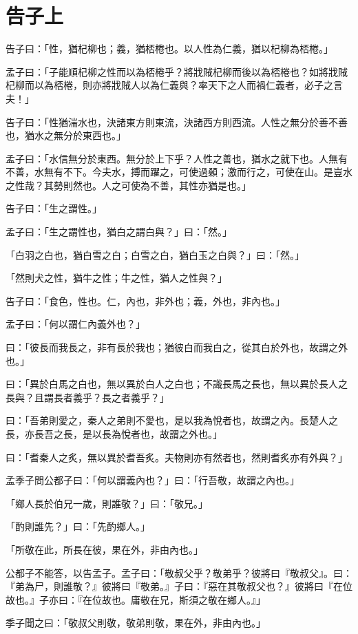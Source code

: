 \documentclass[12pt,a4paper]{ctexbook}
\begin{document}
\section{告子上}
告子曰：「性，猶杞柳也；義，猶桮棬也。以人性為仁義，猶以杞柳為桮棬。」\par
孟子曰：「子能順杞柳之性而以為桮棬乎？將戕賊杞柳而後以為桮棬也？如將戕賊杞柳而以為桮棬，則亦將戕賊人以為仁義與？率天下之人而禍仁義者，必子之言夫！」\par
告子曰：「性猶湍水也，決諸東方則東流，決諸西方則西流。人性之無分於善不善也，猶水之無分於東西也。」\par
孟子曰：「水信無分於東西。無分於上下乎？人性之善也，猶水之就下也。人無有不善，水無有不下。今夫水，搏而躍之，可使過顙；激而行之，可使在山。是豈水之性哉？其勢則然也。人之可使為不善，其性亦猶是也。」\par
告子曰：「生之謂性。」\par
孟子曰：「生之謂性也，猶白之謂白與？」曰：「然。」\par
「白羽之白也，猶白雪之白；白雪之白，猶白玉之白與？」曰：「然。」\par
「然則犬之性，猶牛之性；牛之性，猶人之性與？」\par
告子曰：「食色，性也。仁，內也，非外也；義，外也，非內也。」\par
孟子曰：「何以謂仁內義外也？」\par
曰：「彼長而我長之，非有長於我也；猶彼白而我白之，從其白於外也，故謂之外也。」\par
曰：「異於白馬之白也，無以異於白人之白也；不識長馬之長也，無以異於長人之長與？且謂長者義乎？長之者義乎？」\par
曰：「吾弟則愛之，秦人之弟則不愛也，是以我為悅者也，故謂之內。長楚人之長，亦長吾之長，是以長為悅者也，故謂之外也。」\par
曰：「耆秦人之炙，無以異於耆吾炙。夫物則亦有然者也，然則耆炙亦有外與？」\par
孟季子問公都子曰：「何以謂義內也？」曰：「行吾敬，故謂之內也。」\par
「鄉人長於伯兄一歲，則誰敬？」曰：「敬兄。」\par
「酌則誰先？」曰：「先酌鄉人。」\par
「所敬在此，所長在彼，果在外，非由內也。」\par
公都子不能答，以告孟子。孟子曰：「敬叔父乎？敬弟乎？彼將曰『敬叔父』。曰：『弟為尸，則誰敬？』彼將曰『敬弟。』子曰：『惡在其敬叔父也？』彼將曰『在位故也。』子亦曰：『在位故也。庸敬在兄，斯須之敬在鄉人。』」\par
季子聞之曰：「敬叔父則敬，敬弟則敬，果在外，非由內也。」\par
\end{document}

